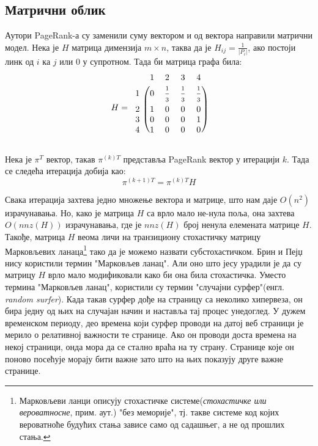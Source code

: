 \subsection{Матрични облик}
Аутори  PageRank-а су заменили суму вектором и од вектора направили матрични модел. Нека је $H$ матрица димензија $m\times n$, таква да је $H_{ij}=\frac{1}{\left |P_{i}  \right |}$, ако постоји линк од $i$ ка $j$ или $0$ у супротном. Тада би матрица графа била:
\[
H=
\begin{blockarray}{ccccc}
& 1 & 2 & 3 & 4  \\
\begin{block}{c(cccc)}
  1 & 0 & \frac{\strut 1}{\strut 3} & \frac{\strut 1}{\strut 3} & \frac{\strut 1}{\strut 3}  \\
  2 & 1 & 0 & 0 & 0  \\
  3 & 0 & 0 & 0 & 1  \\
  4 & 1 & 0 & 0 & 0  \\
\end{block}
\end{blockarray}
 \]

Нека је $\pi^{T}$ вектор, такав $\pi^{(k)T}$ представља PageRank вектор у итерацији $k$. Тада се следећа итерација добија као:
\begin{equation}
\pi^{(k+1) T}=\pi^{(k)T}H
\end{equation}

Свака итерација захтева једно множење вектора и матрице, што нам даје $O(n^{2})$ израчунавања. Но, како је матрица $H$ са врло мало не-нула поља, она захтева $O(nnz(H))$ израчунавања, где је $nnz(H)$ број ненула елемената матрице $H$. Такође, матрица $H$ веома личи на транзициону стохастичку матрицу Марковљевих ланаца\footnote{Марковљеви ланци описују стохастичке системе(\emph{стохастичке или вероватносне}, прим. аут.) "без меморије", тј. такве системе код којих вероватноће будућих стања зависе само од садашњег, а не од прошлих стања.\cite{filipovic2006operatori}} тако да је можемо назвати субстохастичком\cite[Ch 4.2]{langville2011google}. Брин и Пејџ нису користили термин "Марковљев ланац". Али оно што јесу урадили је да су матрицу $H$ врло мало модификовали како би она била стохастичка. Уместо термина "Марковљев ланац", користили су термин "случајни сурфер"(енгл. \emph{random surfer}). Када такав сурфер дође на страницу са неколико хипервеза, он бира једну од њих на случајан начин и наставља тај процес унедоглед. У дужем временском периоду, део времена који сурфер проводи на датој веб страници је мерило о релативној важности те странице. Ако он проводи доста времена на некој страници, онда мора да се стално враћа на ту страну. Странице које он поново посећује морају бити важне зато што на њих показују друге важне странице.

